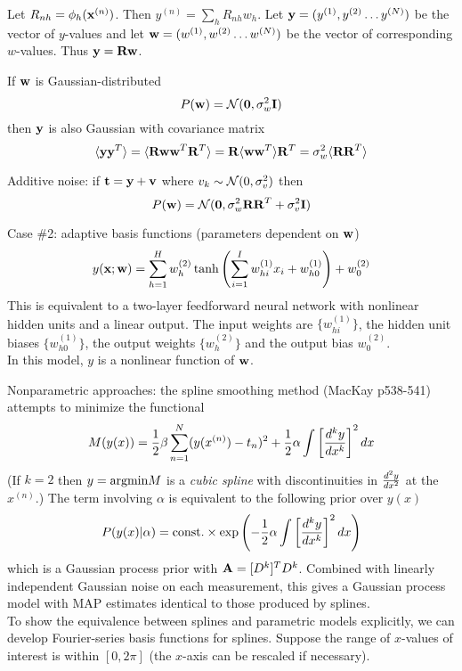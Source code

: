 \documentclass{beamer}
\begin{document}
\begin{frame}{}
  \itemb
  \item Let $R_{nh} = \phi_h ({\bf x}^{(n)})$.
Then $y^{(n)} = \sum_h R_{nh} w_h$.
Let ${\bf y} = (y^{(1)}, y^{(2)} \ldots y^{(N)})$ be the vector of $y$-values and
let ${\bf w} = (w^{(1)}, w^{(2)} \ldots w^{(N)})$ be the vector of corresponding $w$-values.
Thus ${\bf y} = {\bf Rw}$.
  \item If ${\bf w}$ is Gaussian-distributed
\[
P({\bf w}) = {\cal N}({\bf 0},\sigma^2_w {\bf I})
\]
then ${\bf y}$ is also Gaussian with covariance matrix
\[
\langle {\bf yy}^T \rangle = \langle {\bf Rww}^T{\bf R}^T \rangle
 = {\bf R}\langle {\bf ww}^T \rangle{\bf R}^T = \sigma^2_w \langle {\bf RR}^T \rangle
\]
  \item Additive noise: if ${\bf t} = {\bf y} + {\bf v}$ where $v_k \sim {\cal N}(0,\sigma^2_v)$ then
\[
P({\bf w}) = {\cal N}({\bf 0},\sigma^2_w {\bf RR}^T + \sigma^2_v {\bf I})
\]
  \iteme
 \item Case \#2: adaptive basis functions (parameters dependent on ${\bf w}$)
\[
y({\bf x};{\bf w}) = \sum_{h=1}^H w_h^{(2)} \tanh \left( \sum_{i=1}^I w_{hi}^{(1)} x_i + w_{h0}^{(1)} \right) + w_0^{(2)}
\]
This is equivalent to a two-layer feedforward neural network with nonlinear hidden units and a linear output.
The input weights are $\{ w_{hi}^{(1)} \}$, the hidden unit biases $\{ w_{h0}^{(1)} \}$,
the output weights $\{ w_h^{(2)} \}$ and the output bias $w_0^{(2)}$.
\\
In this model, $y$ is a nonlinear function of ${\bf w}$.
 \iteme
\item Nonparametric approaches: the spline smoothing method (MacKay p538-541) attempts to minimize the functional
\[
M(y(x)) = \frac{1}{2} \beta \sum_{n=1}^N (y(x^{(n)}) - t_n)^2 + \frac{1}{2} \alpha \int \left[ \frac{d^{k} {y}}{d {x}^{k}} \right]^2 dx
\]
(If $k=2$ then $y = \mbox{argmin} M$ is a {\em cubic spline} with discontinuities in $\frac{d^{2} {y}}{d {x}^{2}}$ at the $x^{(n)}$.)
The term involving $\alpha$ is equivalent to the following prior over $y(x)$
\[
P(y(x)|\alpha) = \mbox{const.} \times \exp \left( -\frac{1}{2}\alpha\int \left[ \frac{d^{k} {y}}{d {x}^{k}} \right]^2 dx \right)
\]
which is a Gaussian process prior with ${\bf A} = [D^k]^T D^k$.
Combined with linearly independent Gaussian noise on each measurement,
this gives a Gaussian process model with MAP estimates identical to those produced by splines.
\\
To show the equivalence between splines and parametric models explicitly, we can develop Fourier-series basis functions for splines.
Suppose the range of $x$-values of interest is within $[0,2\pi]$ (the $x$-axis can be rescaled if necessary).

\end{frame}
\end{document}
